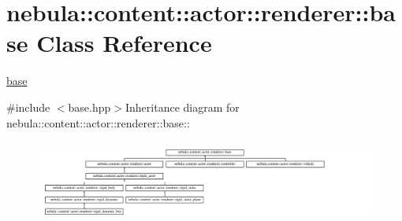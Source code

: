 \hypertarget{classnebula_1_1content_1_1actor_1_1renderer_1_1base}{
\section{nebula::content::actor::renderer::base Class Reference}
\label{classnebula_1_1content_1_1actor_1_1renderer_1_1base}
}


\hyperlink{classnebula_1_1content_1_1actor_1_1renderer_1_1base}{base}  


{\ttfamily \#include $<$base.hpp$>$}Inheritance diagram for nebula::content::actor::renderer::base::\begin{figure}[H]
\begin{center}
\leavevmode
\includegraphics[height=2.72727cm]{classnebula_1_1content_1_1actor_1_1renderer_1_1base}
\end{center}
\end{figure}
